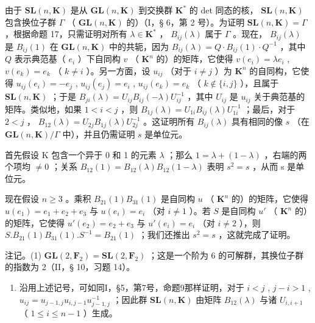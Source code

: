 由于 \(\mathbf{SL}(n, \mathbf{K})\) 是从 \(\mathbf{GL}(n, \mathbf{K})\) 到交换群 \(\mathbf{K}^*\) 的 det 同态的核， \(\mathbf{SL}(n, \mathbf{K})\) 包含换位子群 \(\Gamma\) （ \(\mathbf{GL}(n, \mathbf{K})\) 的）（I，§ 6，第 2 号）。为证明 \(\mathbf{SL}(n, \mathbf{K}) = \Gamma\) ，根据命题 17，只需证明对所有 \(\lambda \in \mathbf{K}^*\) ， \(B_{ij}(\lambda)\) 属于 \(\Gamma\) 。现在， \(B_{ij}(\lambda)\) 是 \(B_{ij}(1)\) 在 \(\mathbf{GL}(n, \mathbf{K})\) 中的共轭，因为 \(B_{ij}(\lambda) = Q \cdot B_{ij}(1) \cdot Q^{-1}\) ，其中 \(Q\) 表示典范基（ \(e_i\) ）下自同构 \(v\) （ \(\mathbf{K}^n\) 的）的矩阵，它使得 \(v(e_i) = \lambda e_i\) , \(v(e_k) = e_k\) （ \(k \neq i\) ）。另一方面，设 \(u_{ij}\) （对于 \(i \neq j\) ）为 \(\mathbf{K}^n\) 的自同构，它使得 \(u_{ij}(e_i) = -e_j\) , \(u_{ij}(e_j) = e_i\) , \(u_{ij}(e_k) = e_k\) （ \(k \notin \{i, j\}\) ），且属于 \(\mathbf{SL}(n, \mathbf{K})\) ；于是 \(B_{ji}(\lambda) = U_{ij}B_{ij}(-\lambda)U_{ij}^{-1}\) ，其中 \(U_{ij}\) 是 \(u_{ij}\) 关于典范基的矩阵。类似地，如果 \(1 < i < j\) ，则 \(B_{1j}(\lambda) = U_{1i}B_{ij}(\lambda)U_{1i}^{-1}\) ；最后，对于 \(2 < j\) ， \(B_{12}(\lambda) = U_{2j}B_{1j}(\lambda)U_{2j}^{-1}\) 。这证明所有 \(B_{ij}(\lambda)\) 具有相同的像 \(s\) （在 \(\mathbf{GL}(n, \mathbf{K}) / \Gamma\) 中），并且仍需证明 \(s\) 是单位元。

首先假设 K 包含一个异于 0 和 1 的元素 \(\lambda\) ；那么 \(1 = \lambda + (1 - \lambda)\) ，右端的两个项均 \(\neq 0\) ；关系 \(B_{12}(1) = B_{12}(\lambda)B_{12}(1 - \lambda)\) 表明 \(s^{2} = s\) ，从而 s 是单位元。

现在假设 \(n \geqslant 3\) 。乘积 \(B_{21}(1)B_{31}(1)\) 是自同构 \(u\) （ \(\mathbf{K}^n\) 的）的矩阵，它使得 \(u(e_1) = e_1 + e_2 + e_3\) 与 \(u(e_i) = e_i\) （对 \(i \neq 1\) ）。若 \(S\) 是自同构 \(u'\) （ \(\mathbf{K}^n\) 的）的矩阵，它使得 \(u'(e_2) = e_2 + e_3\) 与 \(u'(e_i) = e_i\) （对 \(i \neq 2\) ），则 \(S.B_{21}(1)B_{31}(1).S^{-1} = B_{21}(1)\) ；我们还推出 \(s^2 = s\) ，这就完成了证明。

注记。(1) \(\mathbf{GL}(2, \mathbf{F}_2) = \mathbf{SL}(2, \mathbf{F}_2)\) ；这是一个阶为 6 的可解群，其换位子群的指数为 2（II，§ 10，习题 14）。

\begin{enumerate}
\def\labelenumi{(\arabic{enumi})}
\setcounter{enumi}{1}
\tightlist
\item
  沿用上述记号，可如同I，§5，第7号，命题9那样证明，对于 \(i < j\) , \(j - i > 1\) , \(u_{ij} = u_{j-1,j} u_{i,j-1} u_{j-1,j}^{-1}\) ；因此群 \(\mathbf{SL}(n, \mathbf{K})\) 由矩阵 \(B_{12}(\lambda)\) 与诸 \(U_{i,i+1}\) （ \(1 \leqslant i \leqslant n - 1\) ）生成。
\end{enumerate}


